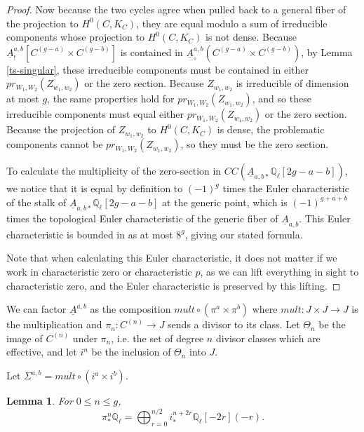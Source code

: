 \documentclass[12pt]{amsart}
\newtheorem{lemma}[theorem]{Lemma}
\theoremstyle{definition}
\theoremstyle{remark}
\begin{document}
\begin{proof}
Now because the two cycles agree when pulled back to a general fiber of the projection to $H^0(C, K_C)$, they are equal modulo a sum of irreducible components whose projection to $H^0(C, K_C)$ is not dense. Because $ \underline{A}^{a,b}_! [ C^{(g-a)} \times C^{(g-b) }]$ is contained in $ \underline{A}^{a,b}_{\circ} ( C^{(g-a)} \times C^{(g-b) })$, by Lemma \ref{ts-singular}, these irreducible components must be contained in either $pr_{W_1,W_2} (Z_{w_1,w_2})$ or the zero section. Because $Z_{w_1,w_2}$ is irreducible of dimension at most $g$, the same properties hold for $pr_{W_1,W_2} (Z_{w_1,w_2})$, and so these irreducible components must equal either $pr_{W_1,W_2} (Z_{w_1,w_2})$ or the zero section. Because the projection of $Z_{w_1,w_2}$ to $H^0(C,K_C)$ is dense, the problematic  components cannot be $pr_{W_1,W_2} (Z_{w_1,w_2})$, so they must be the zero section.


To calculate the multiplicity of the zero-section in $CC ( \underline{A}_{a,b *} \mathbb Q_\ell [ 2g-a-b] )$, we notice that it is equal by definition to $(-1)^g$ times the Euler characteristic of the stalk of $\underline{A}_{a,b *} \mathbb Q_\ell [ 2g-a-b]$ at the generic point, which is $(-1)^{g+ a+b}$ times the topological Euler characteristic of the generic fiber of $\underline{A}_{a,b}$. This Euler characteristic is bounded in \citep[ Proposition 3.16]{TS} as at most $8^g$, giving our stated formula.

Note that when calculating this Euler characteristic, it does not matter if we work in characteristic zero or characteristic $p$, as we can lift everything in sight to characteristic zero, and the Euler characteristic is preserved by this lifting. \end{proof} 

We can factor $\underline{A}^{a,b}$ as the composition $mult \circ (\pi^a \times \pi^b)$ where $mult: J \times J \to J$ is the multiplication and $\pi_n : C^{(n)}\to J$ sends a divisor to its class. Let $\Theta_n$ be the image of $C^{(n)}$ under $\pi_n$, i.e. the set of degree $n$ divisor classes which are effective, and let $i^n$ be the inclusion of $\Theta_n$ into $J$.

Let $\Sigma^{a,b} = mult \circ (i^a \times i^b) $.

\begin{lemma}\label{ts-decomposition} For $0 \leq n \leq g$, \[ \pi^n_* \mathbb Q_\ell= \bigoplus_{r=0}^{n/2} i^{n+2r}_* \mathbb Q_\ell [-2r] (-r) .\] \end{lemma}
\end{document}
